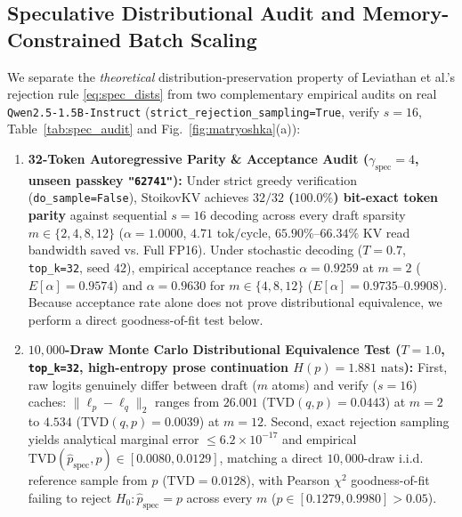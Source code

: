 \documentclass[conference]{IEEEtran}
\begin{document}
\subsection{Speculative Distributional Audit and Memory-Constrained Batch Scaling}
We separate the \emph{theoretical} distribution-preservation property of Leviathan et al.'s rejection rule \eqref{eq:spec_dists} from two complementary empirical audits on real \texttt{Qwen2.5-1.5B-Instruct} (\texttt{strict\_rejection\_sampling=True}, verify $s = 16$, Table~\ref{tab:spec_audit} and Fig.~\ref{fig:matryoshka}(a)):
\begin{enumerate}
    \item \textbf{32-Token Autoregressive Parity \& Acceptance Audit ($\gamma_{\text{spec}} = 4$, unseen passkey \texttt{"62741"}):} Under strict greedy verification (\texttt{do\_sample=False}), StoikovKV achieves \textbf{$32/32$ ($100.0\%$) bit-exact token parity} against sequential $s = 16$ decoding across every draft sparsity $m \in \{2, 4, 8, 12\}$ ($\alpha = 1.0000$, $4.71\text{ tok/cycle}$, $65.90\%$--$66.34\%$ KV read bandwidth saved vs. Full FP16). Under stochastic decoding ($T = 0.7$, \texttt{top\_k=32}, seed $42$), empirical acceptance reaches $\alpha = 0.9259$ at $m=2$ ($E[\alpha] = 0.9574$) and $\alpha = 0.9630$ for $m \in \{4, 8, 12\}$ ($E[\alpha] = 0.9735$--$0.9908$). Because acceptance rate alone does not prove distributional equivalence, we perform a direct goodness-of-fit test below.
    \item \textbf{$10{,}000$-Draw Monte Carlo Distributional Equivalence Test ($T = 1.0$, \texttt{top\_k=32}, high-entropy prose continuation $H(p) = 1.881\text{ nats}$):} First, raw logits genuinely differ between draft ($m$ atoms) and verify ($s=16$) caches: $\|\ell_p - \ell_q\|_2$ ranges from $26.001$ ($\text{TVD}(q, p) = 0.0443$) at $m=2$ to $4.534$ ($\text{TVD}(q, p) = 0.0039$) at $m=12$. Second, exact rejection sampling yields analytical marginal error $\le 6.2 \times 10^{-17}$ and empirical $\text{TVD}(\hat{p}_{\text{spec}}, p) \in [0.0080, 0.0129]$, matching a direct $10{,}000$-draw i.i.d. reference sample from $p$ ($\text{TVD} = 0.0128$), with Pearson $\chi^2$ goodness-of-fit failing to reject $H_0: \hat{p}_{\text{spec}} = p$ across every $m$ ($p \in [0.1279, 0.9980] > 0.05$).
\end{enumerate}
\end{document}
